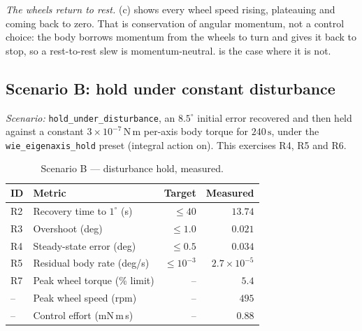 \documentclass[conference,10pt,a4paper]{IEEEtran}
\newcommand{\unit}[1]{\ensuremath{\,\mathrm{#1}}}
\begin{document}
\emph{The wheels return to rest.} (c) shows every wheel
speed rising, plateauing and coming back to zero. That is conservation of
angular momentum, not a control choice: the body borrows momentum from the
wheels to turn and gives it back to stop, so a rest-to-rest slew is
momentum-neutral.  is the case where it is not.

\subsection{Scenario B: hold under constant disturbance}
\label{sec:scenarioB}

\textit{Scenario:} \texttt{hold\_under\_disturbance}, an $8.5^\circ$ initial
error recovered and then held against a constant $3\times10^{-7}\unit{N\,m}$
per-axis body torque for $240\unit{s}$, under the \texttt{wie\_eigenaxis\_hold}
preset (integral action on). This exercises R4, R5 and R6.

\begin{table}[!t]
\centering
\caption{Scenario B --- disturbance hold, measured.}
\label{tab:results_hold}
\footnotesize
\begin{tabular}{@{}llrr@{}}
\toprule
\textbf{ID} & \textbf{Metric} & \textbf{Target} & \textbf{Measured} \\
\midrule
R2 & Recovery time to $1^\circ$ (s)  & $\le40$    & $13.74$ \\
R3 & Overshoot (deg)                 & $\le1.0$   & $0.021$ \\
R4 & Steady-state error (deg)        & $\le0.5$   & $0.034$ \\
R5 & Residual body rate (deg/s)      & $\le10^{-3}$ & $2.7\times10^{-5}$ \\
R7 & Peak wheel torque (\% limit)    & --         & $5.4$ \\
-- & Peak wheel speed (rpm)          & --         & $495$ \\
-- & Control effort (mN\,m\,s)       & --         & $0.88$ \\
\bottomrule
\end{tabular}
\end{table}
\end{document}

